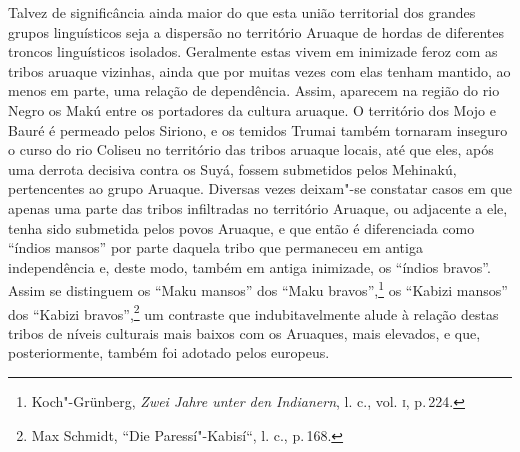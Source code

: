 Talvez de significância ainda maior do que esta união territorial dos
grandes grupos linguísticos seja a dispersão no território Aruaque de
hordas de diferentes troncos linguísticos isolados. Geralmente estas
vivem em inimizade feroz com as tribos aruaque vizinhas, ainda que por muitas
vezes com elas tenham mantido, ao menos em parte, uma relação de
dependência. Assim, aparecem na região do rio Negro os Makú
entre os portadores da cultura aruaque. O território dos Mojo e Bauré é
permeado pelos Siriono, e os temidos Trumai também tornaram inseguro o
curso do rio Coliseu no território das tribos aruaque locais, até que
eles, após uma derrota decisiva contra os Suyá, fossem submetidos pelos
Mehinakú, pertencentes ao grupo Aruaque. Diversas vezes deixam"-se
constatar casos em que apenas uma parte das tribos infiltradas no
território Aruaque, ou adjacente a ele, tenha sido submetida pelos povos Aruaque, e
que então é diferenciada como ``índios mansos'' por parte daquela tribo
que permaneceu em antiga independência e, deste modo, também em antiga
inimizade, os ``índios bravos''. Assim se distinguem os ``Maku mansos''
dos ``Maku bravos'',\footnote{Koch"-Grünberg, \textit{Zwei Jahre unter den
  Indianern}, l. c., vol. \textsc{i}, p.\,224.} os ``Kabizi mansos'' dos ``Kabizi
bravos'',\footnote{Max Schmidt, ``Die Paressí"-Kabisí``, l. c., p.\,168.}
um contraste que indubitavelmente alude à relação destas tribos de
níveis culturais mais baixos com os Aruaques, mais elevados, e que, posteriormente, 
também foi adotado pelos europeus.

